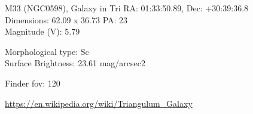 \begin{block}{M33 (NGC0598), Galaxy in Tri}
    RA: 01:33:50.89, Dec: +30:39:36.8 \\ 
    Dimensions: 62.09 x 36.73 PA: 23 \\ 
    Magnitude (V): 5.79

    Morphological type: Sc \\ 
    Surface Brightness: 23.61 mag/arcsec2 


    Finder fov: 120 

    \url{https://en.wikipedia.org/wiki/Triangulum_Galaxy} 
\end{block}